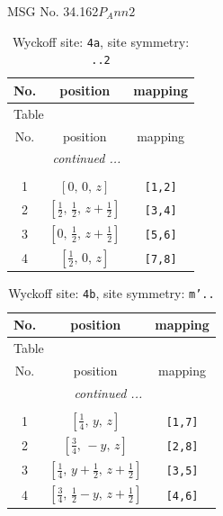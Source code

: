 \documentclass[fleqn,8pt]{jsarticle}
\begin{document}
\setcounter{MaxMatrixCols}{32}

\renewcommand{\tablename}{Table~}
\renewcommand{\figurename}{Figure~}
\begin{center}
\LARGE
MSG No. 34.162\quad$P_{A}nn2$
\end{center}
\renewcommand{\arraystretch}{1.2}
\begin{longtable}{ccc}
\caption{Wyckoff site: {\tt 4a}, site symmetry: {\tt ..2}}
 \\
 \hline \hline
No. & position & mapping \\ \hline \endfirsthead

\multicolumn{2}{l}{\tablename\ \thetable{}} \\
 \hline \hline
No. & position & mapping \\ \hline \endhead

 \hline \hline
\multicolumn{2}{r}{\footnotesize\it continued ...} \\ \endfoot

 \hline \hline
\multicolumn{2}{r}{} \\ \endlastfoot

1 & $\left[ 0,\, 0,\, z \right]$ & {\tt [1,2]} \\ \hline
2 & $\left[ \frac{1}{2},\, \frac{1}{2},\, z + \frac{1}{2} \right]$ & {\tt [3,4]} \\ \hline
3 & $\left[ 0,\, \frac{1}{2},\, z + \frac{1}{2} \right]$ & {\tt [5,6]} \\ \hline
4 & $\left[ \frac{1}{2},\, 0,\, z \right]$ & {\tt [7,8]} \\
\end{longtable}
\renewcommand{\arraystretch}{1.2}
\begin{longtable}{ccc}
\caption{Wyckoff site: {\tt 4b}, site symmetry: {\tt m'..}}
 \\
 \hline \hline
No. & position & mapping \\ \hline \endfirsthead

\multicolumn{2}{l}{\tablename\ \thetable{}} \\
 \hline \hline
No. & position & mapping \\ \hline \endhead

 \hline \hline
\multicolumn{2}{r}{\footnotesize\it continued ...} \\ \endfoot

 \hline \hline
\multicolumn{2}{r}{} \\ \endlastfoot

1 & $\left[ \frac{1}{4},\, y,\, z \right]$ & {\tt [1,7]} \\ \hline
2 & $\left[ \frac{3}{4},\, - y,\, z \right]$ & {\tt [2,8]} \\ \hline
3 & $\left[ \frac{1}{4},\, y + \frac{1}{2},\, z + \frac{1}{2} \right]$ & {\tt [3,5]} \\ \hline
4 & $\left[ \frac{3}{4},\, \frac{1}{2} - y,\, z + \frac{1}{2} \right]$ & {\tt [4,6]} \\
\end{longtable}
\end{document}
